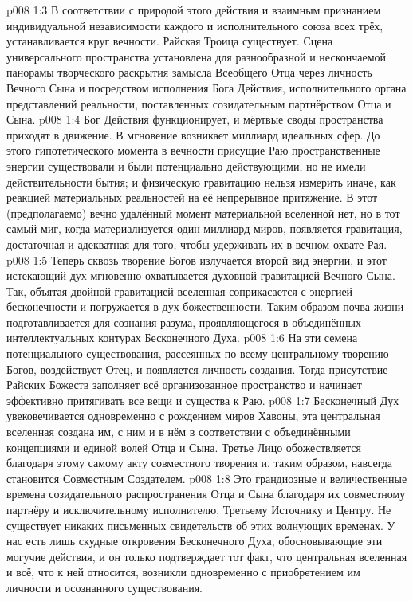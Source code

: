 \vs p008 1:3 В соответствии с природой этого действия и взаимным признанием индивидуальной независимости каждого и исполнительного союза всех трёх, устанавливается круг вечности. Райская Троица существует. Сцена универсального пространства установлена для разнообразной и нескончаемой панорамы творческого раскрытия замысла Всеобщего Отца через личность Вечного Сына и посредством исполнения Бога Действия, исполнительного органа представлений реальности, поставленных созидательным партнёрством Отца и Сына.
\vs p008 1:4 \pc Бог Действия функционирует, и мёртвые своды пространства приходят в движение. В мгновение возникает миллиард идеальных сфер. До этого гипотетического момента в вечности присущие Раю пространственные энергии существовали и были потенциально действующими, но не имели действительности бытия; и физическую гравитацию нельзя измерить иначе, как реакцией материальных реальностей на её непрерывное притяжение. В этот (предполагаемо) вечно удалённый момент материальной вселенной нет, но в тот самый миг, когда материализуется один миллиард миров, появляется гравитация, достаточная и адекватная для того, чтобы удерживать их в вечном охвате Рая.
\vs p008 1:5 Теперь сквозь творение Богов излучается второй вид энергии, и этот истекающий дух мгновенно охватывается духовной гравитацией Вечного Сына. Так, объятая двойной гравитацией вселенная соприкасается с энергией бесконечности и погружается в дух божественности. Таким образом почва жизни подготавливается для сознания разума, проявляющегося в объединённых интеллектуальных контурах Бесконечного Духа.
\vs p008 1:6 На эти семена потенциального существования, рассеянных по всему центральному творению Богов, воздействует Отец, и появляется личность создания. Тогда присутствие Райских Божеств заполняет всё организованное пространство и начинает эффективно притягивать все вещи и существа к Раю.
\vs p008 1:7 \pc Бесконечный Дух увековечивается одновременно с рождением миров Хавоны, эта центральная вселенная создана им, с ним и в нём в соответствии с объединёнными концепциями и единой волей Отца и Сына. Третье Лицо обожествляется благодаря этому самому акту совместного творения и, таким образом, навсегда становится Совместным Создателем.
\vs p008 1:8 \pc Это грандиозные и величественные времена созидательного распространения Отца и Сына благодаря их совместному партнёру и исключительному исполнителю, Третьему Источнику и Центру. Не существует никаких письменных свидетельств об этих волнующих временах. У нас есть лишь скудные откровения Бесконечного Духа, обосновывающие эти могучие действия, и он только подтверждает тот факт, что центральная вселенная и всё, что к ней относится, возникли одновременно с приобретением им личности и осознанного существования.
